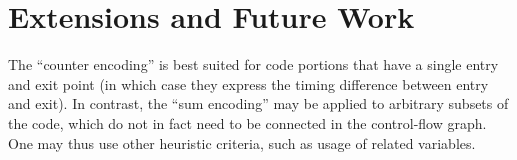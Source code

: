 \documentclass[a4paper,twocolumn,11pt]{article}
\begin{document}
\begin{comment}
A recent approach to program verification is to express the semantics of programs into Horn clauses over unknown predicates, which represent the inductive invariants sought~\parencite{DBLP:conf/sas/BjornerMR13}. These clauses naturally express groupings of program instructions. Algorithms for solving such Horn clauses are typically based on Craig interpolation, which generates new predicates; we saw in \autoref{sec:intractable} that the absence of generation of new predicates in DPLL(T) SMT-solvers is the reason why diamond formulas cause exponential cost. We experimented with the ``unstable'' version of the Z3 SMT-solver, which can solve Horn clauses, on encodings of the diamond WCET problems from~\autoref{sec:intractable}:
\begin{itemize}[noitemsep,topsep=1pt,partopsep=1pt]
\item a ``flat'' encoding, which directly translates the sequence of $2n$ if-then-else statements
\item a ``grouped'' encoding, which first groups into a single predicate the blocks ``A'' and ``B'' associated with~$b_i$, for all $i$.
\end{itemize}
The ``flat'' encoding, again, yields solving times in $\sim 2^n$. The ``grouped'' encoding yields instantaneous answers.
This confirms our intuition that groups of associated statements should be abstracted as a unit, be it using interpolants as in Z3 or using precomputed bounds as in our approach.
Unfortunately we have not had the time to attempt encoding large programs into Horn clauses so as to check whether the good performance on toy diamond examples translates to good performance on larger programs.
We however do not see how the possibility that we have of keeping bounds of non-contiguous portions of code would easily translate into Horn clauses.
\end{comment}

\section{Extensions and Future Work}
\label{sec:extensions}
The ``counter encoding'' is best suited for code portions that have a single entry and exit point (in which case they express the timing difference between entry and exit). In contrast, the ``sum encoding'' may be applied to arbitrary subsets of the code, which do not in fact need to be connected in the control-flow graph. One may thus use other heuristic criteria, such as usage of related variables.
\end{document}
